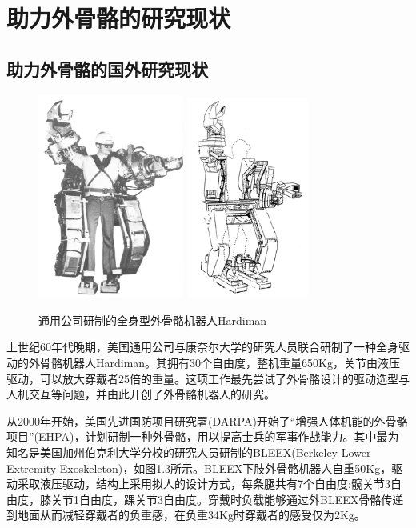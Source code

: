 \section{助力外骨骼的研究现状}

\subsection{助力外骨骼的国外研究现状}

\begin{figure}[!h]
    \label{fig:sub1}{\includegraphics[width=4.8cm]{fig/f3_Hardiman.jpg}}\quad
    \label{fig:sub2}{\includegraphics[width=4cm]{fig/f4_Hardiman.jpg}}
    \caption{通用公司研制的全身型外骨骼机器人Hardiman\cite{p6}}
    \label{fig:subfigs}
\end{figure}

上世纪60年代晚期，美国通用公司与康奈尔大学的研究人员联合研制了一种全身驱动的外骨骼机器人Hardiman\cite{p6}。其拥有30个自由度，整机重量650Kg，关节由液压驱动，可以放大穿戴者25倍的重量。这项工作最先尝试了外骨骼设计的驱动选型与人机交互等问题，并由此开创了外骨骼机器人的研究。

从2000年开始，美国先进国防项目研究署(DARPA)开始了“增强人体机能的外骨骼项目”(EHPA)，计划研制一种外骨骼，用以提高士兵的军事作战能力。其中最为知名是美国加州伯克利大学分校的研究人员研制的BLEEX\cite{p5,p7}(Berkeley Lower Extremity Exoskeleton)，如图1.3所示。BLEEX下肢外骨骼机器人自重50Kg，驱动采取液压驱动，结构上采用拟人的设计方式，每条腿共有7个自由度:髋关节3自由度，膝关节1自由度，踝关节3自由度。穿戴时负载能够通过外BLEEX骨骼传递到地面从而减轻穿戴者的负重感，在负重34Kg时穿戴者的感受仅为2Kg。

